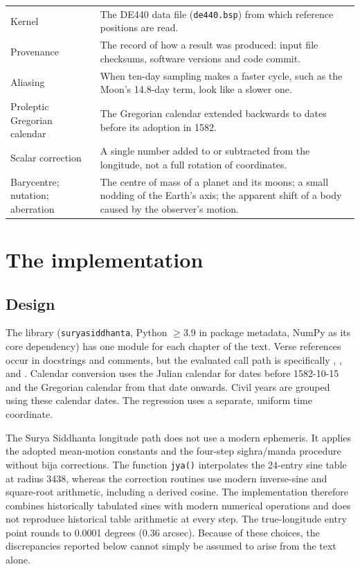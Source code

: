 \documentclass[11pt,a4paper]{article}
\newcommand{\bottomrule}{\hline\hline}}
\newcommand{\file}[1]{\texttt{#1}}
\begin{document}
{\begin{longtable}{@{}>{\raggedright\arraybackslash}p{}>{\raggedright\arraybackslash}p{}@{}}
Kernel & The DE440 data file (\file{de440.bsp}) from which reference positions are read. \\
Provenance & The record of how a result was produced: input file checksums, software versions and code commit. \\
Aliasing & When ten-day sampling makes a faster cycle, such as the Moon's 14.8-day term, look like a slower one. \\
Proleptic Gregorian calendar & The Gregorian calendar extended backwards to dates before its adoption in 1582. \\
Scalar correction & A single number added to or subtracted from the longitude, not a full rotation of coordinates. \\
Barycentre; nutation; aberration & The centre of mass of a planet and its moons; a small nodding of the Earth's axis; the apparent shift of a body caused by the observer's motion. \\
\bottomrule
\end{longtable}
\addtocounter{table}{-1}%
}

\section{The implementation}
\label{sec:impl}

\subsection{Design}

The library (\file{suryasiddhanta}, Python $\geq$3.9 in package metadata, NumPy as its core dependency) has one module for each chapter of the text. Verse references occur in docstrings and comments, but the evaluated call path is specifically , , and . Calendar conversion uses the Julian calendar for dates before 1582-10-15 and the Gregorian calendar from that date onwards. Civil years are grouped using these calendar dates. The regression uses a separate, uniform time coordinate.

The Surya Siddhanta longitude path does not use a modern ephemeris. It applies the adopted mean-motion constants and the four-step sighra/manda procedure without bija corrections. The function \file{jya()} interpolates the 24-entry sine table at radius 3438, whereas the correction routines use modern inverse-sine and square-root arithmetic, including a derived cosine. The implementation therefore combines historically tabulated sines with modern numerical operations and does not reproduce historical table arithmetic at every step. The true-longitude entry point rounds to 0.0001 degrees (0.36 arcsec). Because of these choices, the discrepancies reported below cannot simply be assumed to arise from the text alone.
\end{document}
